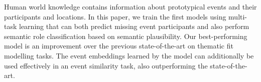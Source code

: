 Human world knowledge contains information about prototypical events and their participants and locations. In this paper, we train the first models using multi-task learning that can both predict missing event participants and also perform semantic role classification based on semantic plausibility. Our best-performing model is an improvement over the previous state-of-the-art on thematic fit modelling tasks. The event embeddings learned by the model can additionally be used effectively in an event similarity task, also outperforming the state-of-the-art.

